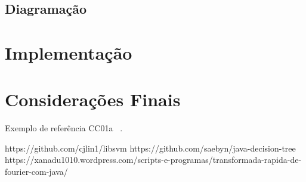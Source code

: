 \documentclass[12pt]{article}
\begin{document}
\subsection{Diagramação}\label{sec:diagramacao}
	
	




\section{Implementação}



\section{Considerações Finais}


Exemplo de referência CC01a ~\cite{CC01}.

https://github.com/cjlin1/libsvm
https://github.com/saebyn/java-decision-tree
https://xanadu1010.wordpress.com/scripts-e-programas/transformada-rapida-de-fourier-com-java/

{}

\end{document}
